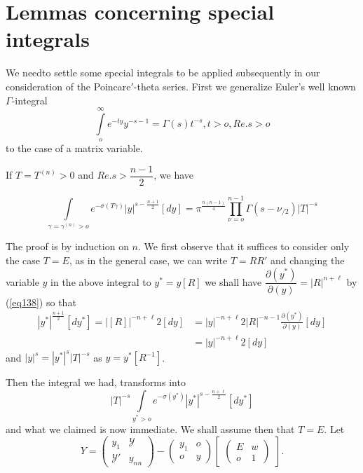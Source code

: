
\chapter{Lemmas concerning special integrals}%

We need\pageoriginale  to settle some special integrals to be applied
subsequently in 
our consideration of the Poincare$'$-theta series. First we generalize
Euler's well known $\Gamma$-integral  
$$
\int\limits_o^\infty e^{-ty} y^{-s -1} = \Gamma (s) t^{-s}, t > 
o, Re. s > o 
$$
to the case of a matrix variable.

\setcounter{lem}{13}
\begin{lem}\label{chap8:lem14}%
If $T = T^{(n)} > 0$  and $ Re. s > \dfrac{n -1}{2}$, we have
\end{lem}
\begin{equation*}
\int\limits_{\gamma = \gamma^{(n)} > o} e^{- \sigma (T \gamma)} | y
|^{s-\frac{n+1}{2}} [dy] = \pi^{\frac{n(n-1)}{4}} 
\prod\limits^{n-1}_{\nu = o} \Gamma (s - \nu_{/2}) | T |^{-s}
\tag{143}\label{eq143}  
\end{equation*}

The proof is by induction on $n$. We first observe that it suffices to
consider only the case $T = E$, as in the general case, we can write
$T = R R'$ and changing the variable $y$ in the above integral to
$y^* = y [R]$ we shall have $\dfrac{\partial (y^*
  )}{\partial (y)} = | R |^{n+\ell}$ by (\ref{eq138}) so that  
\begin{align*}
| y^* |^{\frac{n+1}{2}} [ d y^* ] = | [R] |^{-n+\ell}{2} [ d
  y ] & = | y |^{-n + \ell}{2} | R |^{-n-1} \frac{\partial
  (y^*)}{\partial (y)} [ d y ] \\ 
&= | y |^{-n + \ell}{2} [ d y ]
\end{align*}
and $| y |^s = | y^* |^s  | T |^{-s}$ as $y = y^* [
  R^{-1} ]$. 

Then the integral we had, transforms into 
$$
| T |^{-s} \int\limits_{y^* > o} e^{- \sigma ({y^*})} | y^*
|^{s - \frac{n+ \ell}{2}} [ d y^* ] 
$$
and what we claimed is now immediate. We shall assume then that $T =
E$. Let  
$$
Y = 
\begin{pmatrix}
y_1 & \mathscr{Y}\\ 
\mathscr{Y}' & y_{n n}
\end{pmatrix}
-
\begin{pmatrix}
y_1 & o \\
o & y
\end{pmatrix}
\begin{bmatrix}
\begin{pmatrix}
E & w\\
o & 1
\end{pmatrix}
\end{bmatrix}.
$$


